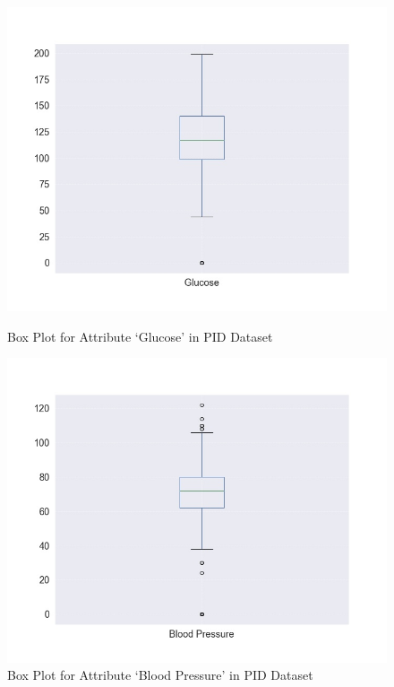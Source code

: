 \begin{figure}[h]
    \centering 
    \begin{minipage}{0.45\textwidth}
        \includegraphics[width=\textwidth]{images/fig11}
        \caption{Box Plot for Attribute `Glucose' in PID Dataset}
        \label{fig11}
    \end{minipage}
    \quad
    \begin{minipage}{0.45\textwidth}
        \includegraphics[width=\textwidth]{images/fig12}
        \caption{Box Plot for Attribute `Blood Pressure' in PID Dataset}
        \label{fig12}
    \end{minipage}
\end{figure}

